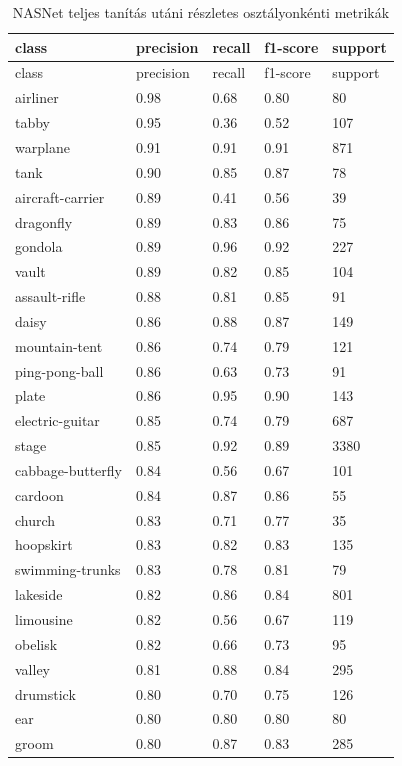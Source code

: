 \begin{center}
\begin{longtable}{lllll}
\caption{NASNet teljes tanítás utáni részletes osztályonkénti metrikák}\label{tab:phase2_NASNet_class_table}\\
\toprule
class & precision & recall & f1-score & support \\
\midrule
\endfirsthead
\toprule
class & precision & recall & f1-score & support \\
\midrule
\endhead
airliner & 0.98 & 0.68 & 0.80 & 80 \\
tabby & 0.95 & 0.36 & 0.52 & 107 \\
warplane & 0.91 & 0.91 & 0.91 & 871 \\
tank & 0.90 & 0.85 & 0.87 & 78 \\
aircraft-carrier & 0.89 & 0.41 & 0.56 & 39 \\
dragonfly & 0.89 & 0.83 & 0.86 & 75 \\
gondola & 0.89 & 0.96 & 0.92 & 227 \\
vault & 0.89 & 0.82 & 0.85 & 104 \\
assault-rifle & 0.88 & 0.81 & 0.85 & 91 \\
daisy & 0.86 & 0.88 & 0.87 & 149 \\
mountain-tent & 0.86 & 0.74 & 0.79 & 121 \\
ping-pong-ball & 0.86 & 0.63 & 0.73 & 91 \\
plate & 0.86 & 0.95 & 0.90 & 143 \\
electric-guitar & 0.85 & 0.74 & 0.79 & 687 \\
stage & 0.85 & 0.92 & 0.89 & 3380 \\
cabbage-butterfly & 0.84 & 0.56 & 0.67 & 101 \\
cardoon & 0.84 & 0.87 & 0.86 & 55 \\
church & 0.83 & 0.71 & 0.77 & 35 \\
hoopskirt & 0.83 & 0.82 & 0.83 & 135 \\
swimming-trunks & 0.83 & 0.78 & 0.81 & 79 \\
lakeside & 0.82 & 0.86 & 0.84 & 801 \\
limousine & 0.82 & 0.56 & 0.67 & 119 \\
obelisk & 0.82 & 0.66 & 0.73 & 95 \\
valley & 0.81 & 0.88 & 0.84 & 295 \\
drumstick & 0.80 & 0.70 & 0.75 & 126 \\
ear & 0.80 & 0.80 & 0.80 & 80 \\
groom & 0.80 & 0.87 & 0.83 & 285 \\

\end{longtable}
\end{center}

